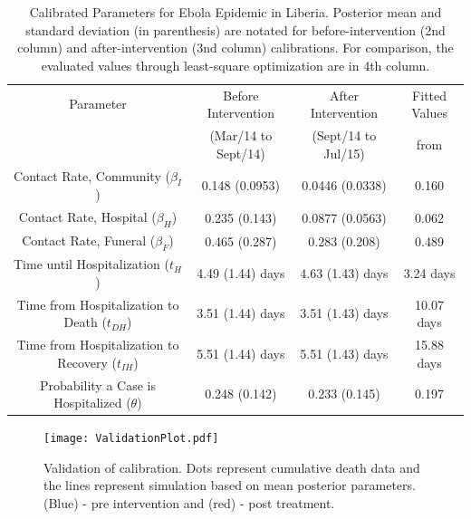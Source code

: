 \begin{table}[ht]
\caption{Calibrated Parameters for Ebola Epidemic in Liberia. Posterior mean and standard deviation (in parenthesis) are notated for before-intervention (2nd column) and after-intervention (3nd column) calibrations. For comparison, the evaluated values through least-square optimization \cite{Rivers2014} are in 4th column.} %
\centering %
\begin{tabular}{c c c c}
\hline\hline %
Parameter &  Before Intervention  & After Intervention & Fitted Values\\ [0.5ex]
 & (Mar/14 to Sept/14) &  (Sept/14 to Jul/15) & from \cite{Rivers2014}\\ [0.5ex] %
\hline %
{Contact Rate, Community  (${\beta_{I}}$) }& {0.148 (0.0953)} & {0.0446 (0.0338)} & 0.160 \\
Contact Rate, Hospital  ($\beta_{H}$) & 0.235 (0.143) & 0.0877 (0.0563) & 0.062\\
Contact Rate, Funeral  ($\beta_{F}$) & 0.465 (0.287)& 0.283 (0.208) & 0.489 \\
Time until Hospitalization (${t_{H}}$) & 4.49 (1.44) days & 4.63 (1.43) days & 3.24 days  \\
Time from Hospitalization to Death (${t_{DH}}$) & 3.51 (1.44) days & 3.51 (1.43) days  & 10.07 days\\
Time from Hospitalization to Recovery (${t_{IH}}$) & 5.51 (1.44) days & 5.51 (1.43) days  & 15.88 days\\
Probability a Case is Hospitalized ($\theta$) & 0.248 (0.142) & 0.233 (0.145) & 0.197\\
[1ex]
\hline
\end{tabular}
\label{tab:calibratedParameters}
\end{table}

\begin{figure}[h]
  \centering
  \texttt{[image: ValidationPlot.pdf]}
  \caption{Validation of calibration. Dots represent cumulative death data and the lines represent simulation based on mean posterior parameters. (Blue) - pre intervention and (red) - post treatment.}
\label{fig:Cumulative _Death}
\end{figure}






